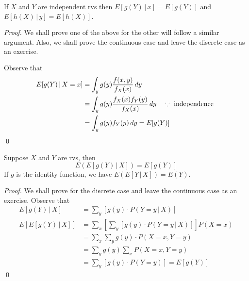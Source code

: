 \documentclass[notoc,notitlepage]{tufte-book}
\begin{document}
\begin{propo}
\label{propo:independence_on_conditional_expectation}
  If $X$ and $Y$ are independent rvs then $E[ g(Y) \, | \, x ] = E [ g(Y) ]$ and $E[ h(X) \, | \, y ] = E[ h(X) ]$.
\end{propo}

\begin{proof}
  We shall prove one of the above for the other will follow a similar argument. Also, we shall prove the continuous case and leave the discrete case as an exercise.

  Observe that
  \begin{align*}
    E [ g(Y) \, | \, X = x ] &= \int_{y} g(y) \frac{f(x, y)}{f_X (x)} \mathop{}\!d{y} \\
      &= \int_{y} g(y) \frac{f_X(x) f_Y(y)}{f_X(x)} \mathop{}\!d{y} \quad \because \text{ independence } \\
      &= \int_{y} g(y) f_Y(y) \mathop{}\!d{y} = E[g(Y)]
  \end{align*}\qed
\end{proof}

\begin{thm}
\label{thm:law_of_total_expectation}
  Suppose $X$ and $Y$ are rvs, then
  \begin{equation*}
    E\left( E[ g(Y) \, | \, X ] \right) = E[ g(Y) ]
  \end{equation*}
  If $g$ is the identity function, we have $E( E[Y \, | \, X] ) = E(Y)$.
\end{thm}

\begin{proof}
  We shall prove for the discrete case and leave the continuous case as an exercise.
  Observe that
  \begin{align*}
    E[ g(Y) \, | \, X ] &= \sum_{y} \left[ g(y) \cdot P(Y = y \, | \, X) \right] \\
    E[E[ g(Y) \, | \, X ]] &= \sum_{x} \left[ \sum_{y} \left[ g(y) \cdot P(Y = y \, | \, X) \right] \right] P(X = x) \\
      &= \sum_{x} \sum_{y} g(y) \cdot P(X = x, Y = y) \\
      &= \sum_{y} g(y) \sum_{x} P(X = x, Y = y) \\
      &= \sum_{y} \left[ g(y) \cdot P(Y = y) \right] = E[ g(Y) ]
  \end{align*}\qed
\end{proof}
\end{document}
